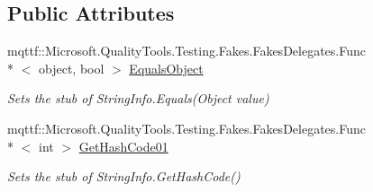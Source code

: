 \subsection*{Public Attributes}
\begin{DoxyCompactItemize}
\item 
mqttf\-::\-Microsoft.\-Quality\-Tools.\-Testing.\-Fakes.\-Fakes\-Delegates.\-Func\\*
$<$ object, bool $>$ \hyperlink{class_system_1_1_globalization_1_1_fakes_1_1_stub_string_info_aacbc1e7417b8a739e2cbe10001f6fdca}{Equals\-Object}
\begin{DoxyCompactList}\small\item\em Sets the stub of String\-Info.\-Equals(\-Object value)\end{DoxyCompactList}\item 
mqttf\-::\-Microsoft.\-Quality\-Tools.\-Testing.\-Fakes.\-Fakes\-Delegates.\-Func\\*
$<$ int $>$ \hyperlink{class_system_1_1_globalization_1_1_fakes_1_1_stub_string_info_abe07c7d4e2b15ed4b750aff96b31668c}{Get\-Hash\-Code01}
\begin{DoxyCompactList}\small\item\em Sets the stub of String\-Info.\-Get\-Hash\-Code()\end{DoxyCompactList}\end{DoxyCompactItemize}
